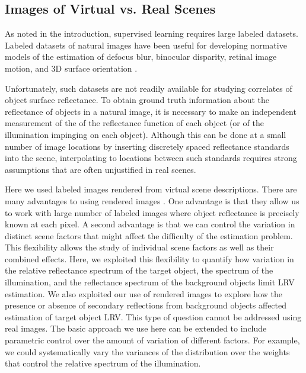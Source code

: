 \documentclass{jov}
\begin{document}
\subsection{Images of Virtual vs. Real Scenes}
As noted in the introduction, supervised learning requires large labeled datasets. Labeled datasets of natural images have been useful for developing normative models of the estimation of defocus blur, binocular disparity, retinal image motion, and 3D surface orientation \cite{burge2011optimal, burge2012optimal, burge2014optimal, burge2015optimal, sebastian2015defocus, kim2018lawful, burge2010natural, girshick2011cardinal, burge2016estimating, goncalves2017not}. 

Unfortunately, such datasets are not readily available for studying correlates of object surface reflectance.
To obtain ground truth information about the reflectance of objects in a natural image, it is necessary to make 
an independent measurement of the of the reflectance function of each object (or of the illumination impinging on each object).
Although this can be done at a small number of image locations by inserting discretely spaced reflectance standards into the scene, 
interpolating to locations between such standards requires strong assumptions that are often unjustified in real scenes.

Here we used labeled images rendered from virtual scene descriptions. 
There are many advantages to using rendered images \cite{Butler:ECCV:2012}.
One advantage is that they allow us to work with large number of labeled images where object reflectance is precisely known at each pixel.
A second advantage is that we can control the variation in distinct scene factors that might affect the difficulty of the estimation problem.
This flexibility allows the study of individual scene factors as well as their combined effects.
Here, we exploited this flexibility to quantify how variation in the relative reflectance spectrum of the target object, the spectrum of the illumination, and the reflectance spectrum of the background objects limit LRV estimation.
We also exploited our use of rendered images to explore how the presence or absence of secondary reflections from background objects affected estimation
of target object LRV.
This type of question cannot be addressed using real images.
The basic approach we use here can be extended to include parametric control over the amount of variation of different factors.
For example, we could systematically vary the variances of the distribution over the weights that control the relative spectrum
of the illumination.
\end{document}
